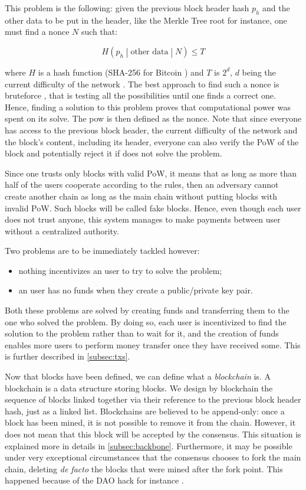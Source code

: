         This problem is the following: given the previous block header hash \(p_h\) and the other data to be put in the header, like the Merkle Tree root for instance, one must find a nonce \(N\) such that:
        
        \[H\left(p_h\middle|\text{other data}\middle|N\right)\leqslant T\]
        
        where \(H\) is a hash function (SHA-256 for Bitcoin \cite{SoK}) and \(T\) is \(2^{d}\), \(d\) being the current difficulty of the network \cite{PoDL}. The best approach to find such a nonce is bruteforce \cite{PoDL}, that is testing all the possibilities until one finds a correct one. Hence, finding a solution to this problem proves that computational power was spent on its solve. The \gls{pow} is then defined as the nonce. Note that since everyone has access to the previous block header, the current difficulty of the network and the block's content, including its header, everyone can also verify the PoW of the block and potentially reject it if does not solve the problem.
        
        Since one trusts only blocks with valid PoW, it means that as long as more than half of the users cooperate according to the rules, then an adversary cannot create another chain as long as the main chain without putting blocks with invalid PoW. Such blocks will be called fake blocks. Hence, even though each user does not trust anyone, this system manages to make payments between user without a centralized authority.
        
        Two problems are to be immediately tackled however:
        
        \begin{itemize}
          \item nothing incentivizes an user to try to solve the problem;
          \item an user has no funds when they create a public/private key pair.
        \end{itemize}
        
        Both these problems are solved by creating funds and transferring them to the one who solved the problem. By doing so, each user is incentivized to find the solution to the problem rather than to wait for it, and the creation of funds enables more users to perform money transfer once they have received some. This is further described in \autoref{subsec:txs}.
        
        Now that blocks have been defined, we can define what a \textit{blockchain} is. A blockchain is a data structure storing blocks. We design by blockchain the sequence of blocks linked together via their reference to the previous block header hash, just as a linked list. Blockchains are believed to be append-only: once a block has been mined, it is not possible to remove it from the chain. However, it does not mean that this block will be accepted by the consensus. This situation is explained more in details in \autoref{subsec:backbone}. Furthermore, it may be possible under very exceptional circumstances that the consensus chooses to fork the main chain, deleting \textit{de facto} the blocks that were mined after the fork point. This happened because of the DAO hack for instance \cite{DAO}.
      
